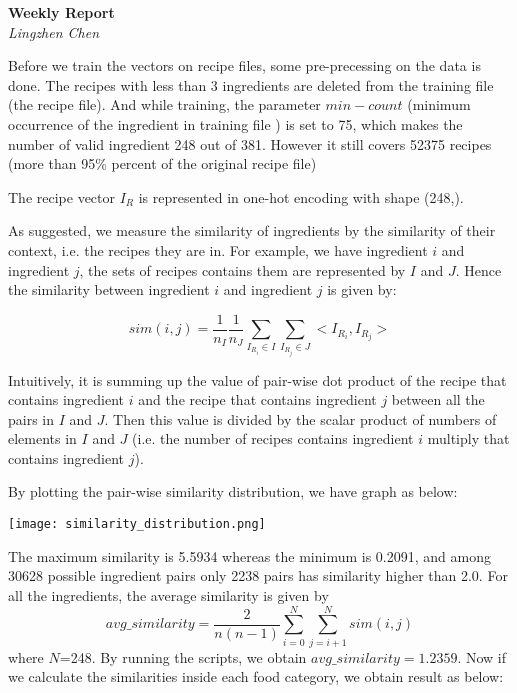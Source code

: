 \documentclass[12pt]{article}
\begin{document}
\begin{titlepage}
   \begin{center}
      \Large\textbf{Weekly Report}\\
      \large\textit{Lingzhen Chen}
   \end{center}
\end{titlepage}

Before we train the vectors on recipe files, some pre-precessing on the data is done. The recipes with less than 3 ingredients are deleted from the training file (the recipe file). And while training, the parameter $min-count$ (minimum occurrence of the ingredient in training file ) is set to 75, which makes the number of valid ingredient 248 out of 381. However it still covers 52375 recipes (more than 95\% percent of the original recipe file)

The recipe vector $I_R$ is represented in one-hot encoding with shape (248,). 

As suggested, we measure the similarity of ingredients by the similarity of their context, i.e. the recipes they are in. For example, we have ingredient $i$ and ingredient $j$, the sets of recipes contains them are represented by $I$ and $J$. Hence the similarity between ingredient $i$ and ingredient $j$ is given by:

\begin{equation}
sim(i,j) = \frac{1}{n_I}\frac{1}{n_J}\sum_{I_{R_i} \in I}\sum_{ I_{R_j} \in J} <I_{R_i},I_{R_j}>
\end{equation}

Intuitively, it is summing up the value of pair-wise dot product of the recipe that contains ingredient $i$ and the recipe that contains ingredient $j$ between all the pairs in $I$ and $J$. Then this value is divided by the scalar product of numbers of elements in $I$ and $J$ (i.e. the number of recipes contains ingredient $i$ multiply that contains ingredient $j$).

By plotting the pair-wise similarity distribution, we have graph as below:

\begin{center}
\texttt{[image: similarity\_distribution.png]}
\end{center}

The maximum similarity is 5.5934 whereas the minimum is 0.2091, and among 30628 possible ingredient pairs only 2238 pairs has similarity higher than 2.0. For all the ingredients, the average similarity is given by
\begin{equation}
avg\_similarity = \frac{2}{n(n-1)}\sum_{i=0}^{N}\sum_{j=i+1}^{N}sim(i,j)
\end{equation}
where $N$=248.
By running the scripts, we obtain $avg\_similarity=1.2359$.
Now if we calculate the similarities inside each food category, we obtain result as below:
\end{document}
